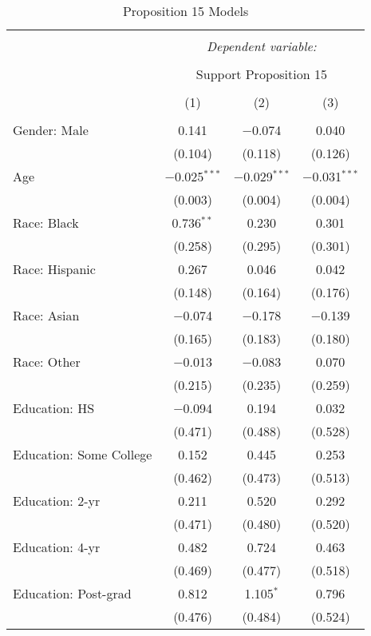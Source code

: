 
\begin{table}[!htbp] \centering 
  \caption{Proposition 15 Models} 
  \label{tab:reg_prop15_long} 
\footnotesize 
\begin{tabular}{@{\extracolsep{5pt}}lccc} 
\\[-1.8ex]\hline 
\hline \\[-1.8ex] 
 & \multicolumn{3}{c}{\textit{Dependent variable:}} \\ 
\cline{2-4} 
\\[-1.8ex] & \multicolumn{3}{c}{Support Proposition 15} \\ 
\\[-1.8ex] & (1) & (2) & (3)\\ 
\hline \\[-1.8ex] 
 Gender: Male & 0.141 & $-$0.074 & 0.040 \\ 
  & (0.104) & (0.118) & (0.126) \\ 
  Age & $-$0.025$^{***}$ & $-$0.029$^{***}$ & $-$0.031$^{***}$ \\ 
  & (0.003) & (0.004) & (0.004) \\ 
  Race: Black & 0.736$^{**}$ & 0.230 & 0.301 \\ 
  & (0.258) & (0.295) & (0.301) \\ 
  Race: Hispanic & 0.267 & 0.046 & 0.042 \\ 
  & (0.148) & (0.164) & (0.176) \\ 
  Race: Asian & $-$0.074 & $-$0.178 & $-$0.139 \\ 
  & (0.165) & (0.183) & (0.180) \\ 
  Race: Other & $-$0.013 & $-$0.083 & 0.070 \\ 
  & (0.215) & (0.235) & (0.259) \\ 
  Education: HS & $-$0.094 & 0.194 & 0.032 \\ 
  & (0.471) & (0.488) & (0.528) \\ 
  Education: Some College & 0.152 & 0.445 & 0.253 \\ 
  & (0.462) & (0.473) & (0.513) \\ 
  Education: 2-yr & 0.211 & 0.520 & 0.292 \\ 
  & (0.471) & (0.480) & (0.520) \\ 
  Education: 4-yr & 0.482 & 0.724 & 0.463 \\ 
  & (0.469) & (0.477) & (0.518) \\ 
  Education: Post-grad & 0.812 & 1.105$^{*}$ & 0.796 \\ 
  & (0.476) & (0.484) & (0.524) \\ 

\end{tabular}
\end{table}
